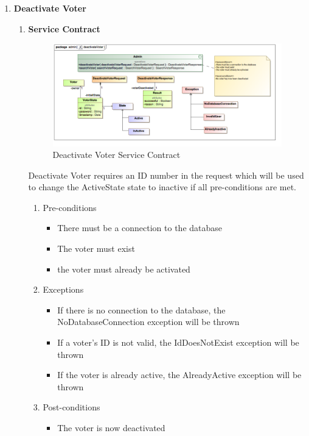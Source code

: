\begin{enumerate}
	\item \textbf{Deactivate Voter}
		\begin{enumerate}
			\item \textbf{Service Contract}
				\begin{figure}[H]
					\centering
					\includegraphics[width=0.75\linewidth]{../Images/Admin/ServiceContracts/deactivateVoter_ServiceContract.png}
					\caption{Deactivate Voter Service Contract}
				\end{figure}
				
				Deactivate Voter requires an ID number in the request which will be used to change the ActiveState state to inactive if all pre-conditions are met.
				\newline	
								
				\begin{enumerate}
					\item Pre-conditions
					\begin{itemize}
						\item There must be a connection to the database
						\item The voter must exist
						\item the voter must already be activated
					\end{itemize}
					
					\item Exceptions
					\begin{itemize}
						\item If there is no connection to the database, the NoDatabaseConnection exception will be thrown
						\item If a voter's ID is not valid, the IdDoesNotExist exception will be thrown
						\item If the voter is already active, the AlreadyActive exception will be thrown
					\end{itemize}
					
					\item Post-conditions
					\begin{itemize}
						\item The voter is now deactivated
					\end{itemize}
				\end{enumerate}
			

\end{enumerate}
\end{enumerate}
